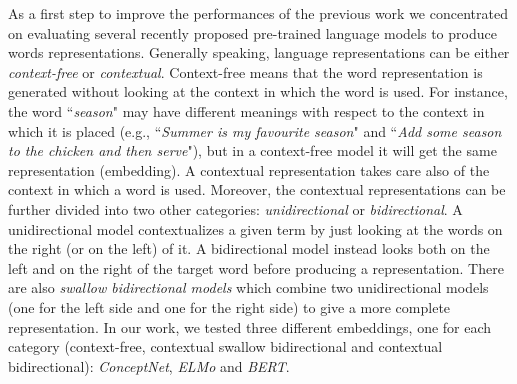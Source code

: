 \documentclass[11pt,a4paper]{article}
\begin{document}
As a first step to improve the performances of the previous work we concentrated on evaluating several recently proposed pre-trained language models to produce words representations. Generally speaking, language representations can be either \textit{context-free} or \textit{contextual}. 
Context-free means that the word representation is generated without looking at the context in which the word is used. For instance, the word ``\textit{season}" may have different meanings with respect to the context in which it is placed (e.g., ``\textit{Summer is my favourite season}" and ``\textit{Add some season to the chicken and then serve}"), but in a context-free model it will get the same representation (embedding). A contextual representation takes care also of the context in which a word is used.
Moreover, the contextual representations can be further divided into two other categories: \textit{unidirectional} or \textit{bidirectional}. 
A unidirectional model contextualizes a given term by just looking at the words on the right (or on the left) of it.  A bidirectional model instead looks both on the left and on the right of the target word before producing a representation. There are also \textit{swallow bidirectional models} which combine two unidirectional models (one for the left side and one for the right side) to give a more complete representation. In our work, we tested three different embeddings, one for each category (context-free, contextual swallow bidirectional and contextual bidirectional): \textit{ConceptNet}, \textit{ELMo} and \textit{BERT}.
\end{document}
